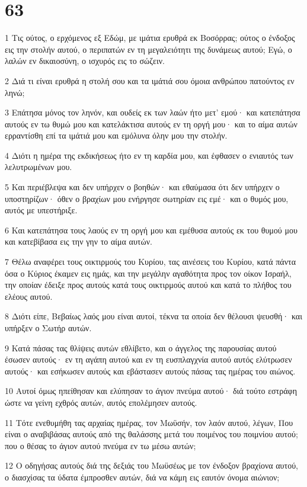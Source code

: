 \chapter{63}

\par 1 Τις ούτος, ο ερχόμενος εξ Εδώμ, με ιμάτια ερυθρά εκ Βοσόρρας; ούτος ο ένδοξος εις την στολήν αυτού, ο περιπατών εν τη μεγαλειότητι της δυνάμεως αυτού; Εγώ, ο λαλών εν δικαιοσύνη, ο ισχυρός εις το σώζειν.
\par 2 Διά τι είναι ερυθρά η στολή σου και τα ιμάτιά σου όμοια ανθρώπου πατούντος εν ληνώ;
\par 3 Επάτησα μόνος τον ληνόν, και ουδείς εκ των λαών ήτο μετ' εμού· και κατεπάτησα αυτούς εν τω θυμώ μου και κατελάκτισα αυτούς εν τη οργή μου· και το αίμα αυτών ερραντίσθη επί τα ιμάτιά μου και εμόλυνα όλην μου την στολήν.
\par 4 Διότι η ημέρα της εκδικήσεως ήτο εν τη καρδία μου, και έφθασεν ο ενιαυτός των λελυτρωμένων μου.
\par 5 Και περιέβλεψα και δεν υπήρχεν ο βοηθών· και εθαύμασα ότι δεν υπήρχεν ο υποστηρίζων· όθεν ο βραχίων μου ενήργησε σωτηρίαν εις εμέ· και ο θυμός μου, αυτός με υπεστήριξε.
\par 6 Και κατεπάτησα τους λαούς εν τη οργή μου και εμέθυσα αυτούς εκ του θυμού μου και κατεβίβασα εις την γην το αίμα αυτών.
\par 7 Θέλω αναφέρει τους οικτιρμούς του Κυρίου, τας αινέσεις του Κυρίου, κατά πάντα όσα ο Κύριος έκαμεν εις ημάς, και την μεγάλην αγαθότητα προς τον οίκον Ισραήλ, την οποίαν έδειξε προς αυτούς κατά τους οικτιρμούς αυτού και κατά το πλήθος του ελέους αυτού.
\par 8 Διότι είπε, Βεβαίως λαός μου είναι αυτοί, τέκνα τα οποία δεν θέλουσι ψευσθή· και υπήρξεν ο Σωτήρ αυτών.
\par 9 Κατά πάσας τας θλίψεις αυτών εθλίβετο, και ο άγγελος της παρουσίας αυτού έσωσεν αυτούς· εν τη αγάπη αυτού και εν τη ευσπλαγχνία αυτού αυτός ελύτρωσεν αυτούς· και εσήκωσεν αυτούς και εβάστασεν αυτούς πάσας τας ημέρας του αιώνος.
\par 10 Αυτοί όμως ηπείθησαν και ελύπησαν το άγιον πνεύμα αυτού· διά τούτο εστράφη ώστε να γείνη εχθρός αυτών, αυτός επολέμησεν αυτούς.
\par 11 Τότε ενεθυμήθη τας αρχαίας ημέρας, τον Μωϋσήν, τον λαόν αυτού, λέγων, Που είναι ο αναβιβάσας αυτούς από της θαλάσσης μετά του ποιμένος του ποιμνίου αυτού; που ο θέσας το άγιον αυτού πνεύμα εν τω μέσω αυτών;
\par 12 Ο οδηγήσας αυτούς διά της δεξιάς του Μωϋσέως με τον ένδοξον βραχίονα αυτού, ο διασχίσας τα ύδατα έμπροσθεν αυτών, διά να κάμη εις εαυτόν όνομα αιώνιον;
